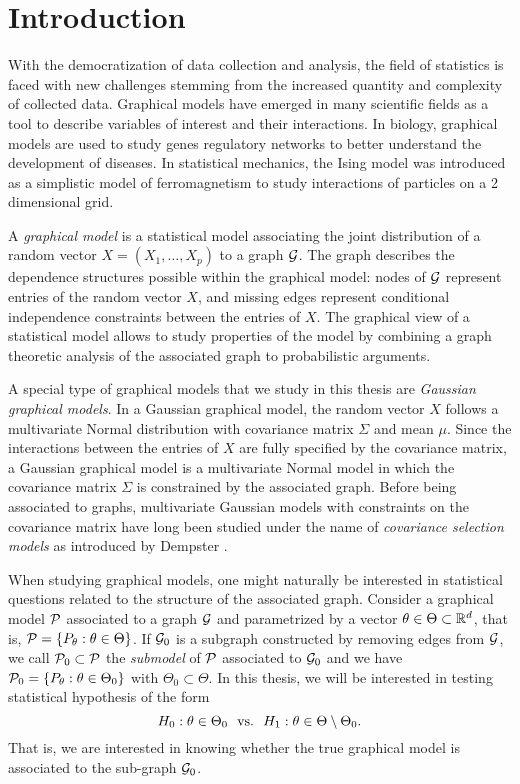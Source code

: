 \section{Introduction}

With the democratization of data collection and analysis, the field of statistics is faced with new challenges stemming from the increased quantity and complexity of collected data. Graphical models have emerged in many scientific fields as a tool to describe variables of interest and their interactions. In biology, graphical models are used to study genes regulatory networks to better understand the development of diseases. In statistical mechanics, the Ising model \cite{ising1925beitrag} was introduced as a simplistic model of ferromagnetism to study interactions of particles on a 2 dimensional grid.

A \textit{graphical model} is a statistical model associating the joint distribution of a random vector $X = (X_1, \ldots, X_p)$ to a graph ${\mathcal{G}}$. The graph describes the dependence structures possible within the graphical model: nodes of ${\mathcal{G}}$ represent entries of the random vector $X$, and missing edges represent conditional independence constraints between the entries of $X$. The graphical view of a statistical model allows to study properties of the model by combining a graph theoretic analysis of the associated graph to probabilistic arguments.

A special type of graphical models that we study in this thesis are \textit{Gaussian graphical models}. In a Gaussian graphical model, the random vector $X$ follows a multivariate Normal distribution with covariance matrix $\Sigma$ and mean $\mu$. Since the interactions between the entries of $X$ are fully specified by the covariance matrix, a Gaussian graphical model is a multivariate Normal model in which the covariance matrix $\Sigma$ is constrained by the associated graph. Before being associated to graphs, multivariate Gaussian models with constraints on the covariance matrix have long been studied under the name of \textit{covariance selection models} as introduced by Dempster \cite{10.2307/2528966}.

When studying graphical models, one might naturally be interested in statistical questions related to the structure of the associated graph. Consider a graphical model ${\mathcal{P}}$ associated to a graph ${\mathcal{G}}$ and parametrized by a vector $\theta \in \Theta \subset \mathbb{R}^d$, that is, ${\mathcal{P}} = {\left\{ P_\theta : \theta \in \Theta \right\}}$. If ${\mathcal{G}}_0$ is a subgraph constructed by removing edges from ${\mathcal{G}}$, we call ${\mathcal{P}}_0 \subset {\mathcal{P}}$ the \textit{submodel} of ${\mathcal{P}}$ associated to ${\mathcal{G}}_0$ and we have ${\mathcal{P}}_0 = {\left\{ P_\theta : \theta \in \Theta_0 \right\}}$ with $\Theta_0 \subset \Theta$. In this thesis, we will be interested in testing statistical hypothesis of the form
\begin{equation*}
    H_0 : \theta \in \Theta_0 \ \ \t{vs.} \ \ H_1 : \theta \in \Theta \setminus \Theta_0.
\end{equation*}
That is, we are interested in knowing whether the true graphical model is associated to the sub-graph ${\mathcal{G}}_0$.

